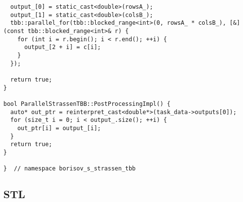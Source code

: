 \documentclass[12pt]{article}
\begin{document}
\begin{lstlisting}
  output_[0] = static_cast<double>(rowsA_);
  output_[1] = static_cast<double>(colsB_);
  tbb::parallel_for(tbb::blocked_range<int>(0, rowsA_ * colsB_), [&](const tbb::blocked_range<int>& r) {
    for (int i = r.begin(); i < r.end(); ++i) {
      output_[2 + i] = c[i];
    }
  });

  return true;
}

bool ParallelStrassenTBB::PostProcessingImpl() {
  auto* out_ptr = reinterpret_cast<double*>(task_data->outputs[0]);
  for (size_t i = 0; i < output_.size(); ++i) {
    out_ptr[i] = output_[i];
  }
  return true;
}

}  // namespace borisov_s_strassen_tbb
\end{lstlisting}

\subsection*{STL}
\end{document}
